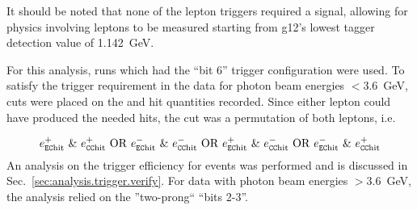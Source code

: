 It should be noted that none of the lepton triggers required a  signal, allowing for physics involving leptons to be measured starting from g12's lowest tagger detection value of 1.142~GeV.

For this analysis, runs which had the ``bit 6'' trigger configuration were used. To satisfy the trigger requirement in the data for photon beam energies $<3.6$~GeV, cuts were placed on the  and  hit quantities recorded. Since either lepton could have produced the needed hits, the cut was a permutation of both leptons, i.e.

	\begin{equation}
e^+_\mathrm{\abbr{EC}hit} \ \& \ e^+_\mathrm{\abbr{CC}hit} \  \mathrm{OR} \ e^-_\mathrm{\abbr{EC}hit} \ \& \ e^-_\mathrm{\abbr{CC}hit} \ \mathrm{OR} \ e^+_\mathrm{\abbr{EC}hit} \ \& \ e^-_\mathrm{\abbr{CC}hit} \ \mathrm{OR} \ e^-_\mathrm{\abbr{EC}hit} \ \& \ e^+_\mathrm{\abbr{CC}hit} \label{eq:ECCC}
	\end{equation}
	An analysis on the trigger efficiency for \pizT events was performed and is discussed in Sec.~\ref{sec:analysis.trigger.verify}. For data with photon beam energies $>3.6$~GeV, the analysis relied on the ''two-prong`` ``bits 2-3''. 
\FloatBarrier
\FloatBarrier
\FloatBarrier
